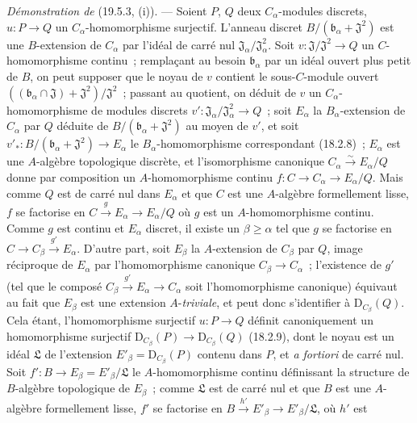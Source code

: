 \begin{env}[19.5.6.1]
\label{0.19.5.6.1-fr}
\emph{Démonstration de} (19.5.3, (i)). --- Soient $P$, $Q$ deux $C_\alpha$-modules discrets,
$u:P\to Q$ un $C_\alpha$-homomorphisme surjectif. L'anneau discret
$B/(\mathfrak b_\alpha+\mathfrak J^2)$ est une $B$-extension de $C_\alpha$ par
l'idéal de carré nul $\mathfrak J_\alpha/\mathfrak J_\alpha^2$. Soit
$v:\mathfrak J/\mathfrak J^2\to Q$ un $C$-homomorphisme continu~; remplaçant
au besoin $\mathfrak b_\alpha$ par un idéal ouvert plus petit de $B$, on peut
supposer que le noyau de $v$ contient le sous-$C$-module ouvert
$((\mathfrak b_\alpha\cap\mathfrak J)+\mathfrak J^2)/\mathfrak J^2$~;
passant au quotient, on déduit de $v$ un $C_\alpha$-homomorphisme de modules
discrets $v':\mathfrak J_\alpha/\mathfrak J_\alpha^2\to Q$~; soit
$E_\alpha$ la $B_\alpha$-extension de $C_\alpha$ par $Q$ déduite de
$B/(\mathfrak b_\alpha+\mathfrak J^2)$ au moyen de $v'$, et soit
$v'_*:B/(\mathfrak b_\alpha+\mathfrak J^2)\to E_\alpha$ le
$B_\alpha$-homomorphisme correspondant (18.2.8)~; $E_\alpha$ est une
$A$-algèbre topologique discrète, et l'isomorphisme canonique
$C_\alpha\xrightarrow{\sim}E_\alpha/Q$ donne par composition un
$A$-homomorphisme continu $f:C\to C_\alpha\to E_\alpha/Q$. Mais comme $Q$ est
de carré nul dans $E_\alpha$ et que $C$ est une $A$-algèbre formellement
lisse, $f$ se factorise en $C\xrightarrow{g}E_\alpha\to E_\alpha/Q$ où $g$
est un $A$-homomorphisme continu. Comme $g$ est continu et $E_\alpha$ discret,
il existe un $\beta\geq\alpha$ tel que $g$ se factorise en
$C\to C_\beta\xrightarrow{g'}E_\alpha$. D'autre part, soit $E_\beta$ la
$A$-extension de $C_\beta$ par $Q$, image réciproque de $E_\alpha$ par
l'homomorphisme canonique $C_\beta\to C_\alpha$~; l'existence de $g'$ (tel que
le composé $C_\beta\xrightarrow{g'}E_\alpha\to C_\alpha$ soit l'homomorphisme canonique)
équivaut au fait que $E_\beta$ est une extension $A$-\emph{triviale}, et peut
donc s'identifier à $\mathrm D_{C_\beta}(Q)$. Cela étant, l'homomorphisme
surjectif $u:P\to Q$ définit canoniquement un
homomorphisme surjectif
$\mathrm D_{C_\beta}(P)\to\mathrm D_{C_\beta}(Q)$ (18.2.9), dont le noyau est
un idéal $\mathfrak L$ de l'extension $E'_\beta=\mathrm D_{C_\beta}(P)$
contenu dans $P$, et \emph{a fortiori} de carré nul. Soit
$f':B\to E_\beta=E'_\beta/\mathfrak L$ le $A$-homomorphisme continu définissant
la structure de $B$-algèbre topologique de $E_\beta$~; comme $\mathfrak L$ est
de carré nul et que $B$ est une $A$-algèbre formellement lisse, $f'$ se
factorise en $B\xrightarrow{h'}E'_\beta\to E'_\beta/\mathfrak L$, où $h'$ est

\end{env}
